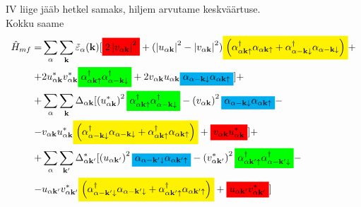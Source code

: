 \documentclass[class=article, crop=false]{standalone}
\newcommand{\mathcolorbox}[2]{\colorbox{#1}{$\displaystyle #2$}}
\begin{document}
IV liige jääb hetkel samaks, hiljem arvutame keskväärtuse.\\
Kokku saame
\begin{equation}\label{key}
	\begin{split}
		\hat{H}_{mf} = & \sum_{ \alpha} \sum_{ \mathbf{k}} \tilde{ \varepsilon}_{ \alpha} ( \mathbf{k}) 
		[ \mathcolorbox{red}{2 \left| v_{ \alpha \mathbf{k}} \right|^{2}} + ( \left| u_{ \alpha \mathbf{k}} \right|^{2} - \left| v_{ \alpha \mathbf{k}} \right|^{2} ) \mathcolorbox{yellow}{ \left( \alpha_{ \alpha \mathbf{k} \uparrow}^{ \dagger} \alpha_{ \alpha \mathbf{k} \uparrow} + \alpha_{ \alpha - \mathbf{k} \downarrow}^{ \dagger} \alpha_{ \alpha - \mathbf{k} \downarrow} \right)} + \\
		+ & 2 u_{ \alpha \mathbf{k}}^{ \ast} v_{ \alpha \mathbf{k}}^{ \ast} \mathcolorbox{green}{ \alpha_{ \alpha \mathbf{k} \uparrow}^{ \dagger} \alpha_{ \alpha - \mathbf{k} \downarrow}^{ \dagger}} + 2 v_{ \alpha \mathbf{k}} u_{ \alpha \mathbf{k}} \mathcolorbox{cyan}{ \alpha_{ \alpha - \mathbf{k} \downarrow} \alpha_{ \alpha \mathbf{k} \uparrow}} ] + \\
		+ & \sum_{ \alpha} \sum_{ \mathbf{k}} \Delta_{ \alpha \mathbf{k}} [ \left( u_{ \alpha \mathbf{k}}^{ \ast} \right)^{2} \mathcolorbox{green}{ \alpha_{ \alpha \mathbf{k} \uparrow}^{ \dagger} \alpha_{ \alpha - \mathbf{k} \downarrow}^{ \dagger}} - \left( v_{ \alpha \mathbf{k}} \right)^{2} \mathcolorbox{cyan}{ \alpha_{ \alpha - \mathbf{k} \downarrow} \alpha_{ \alpha \mathbf{k} \uparrow}} - \\
		- & v_{ \alpha \mathbf{k}} u_{ \alpha \mathbf{k}}^{ \ast} \mathcolorbox{yellow}{ \left( \alpha_{ \alpha - \mathbf{k} \downarrow}^{ \dagger} \alpha_{ \alpha - \mathbf{k} \downarrow} + \alpha_{ \alpha \mathbf{k} \uparrow}^{ \dagger} \alpha_{ \alpha \mathbf{k} \uparrow} \right)} + \mathcolorbox{red}{v_{ \alpha \mathbf{k}} u_{ \alpha \mathbf{k}}^{ \ast}} ] + \\
		+ & \sum_{ \alpha} \sum_{ \mathbf{k}'} \Delta_{ \alpha \mathbf{k}'}^{ \ast} 
		[ \left( u_{ \alpha \mathbf{k}'} \right)^{2} \mathcolorbox{cyan}{ \alpha_{ \alpha - \mathbf{k}' \downarrow} \alpha_{ \alpha \mathbf{k}' \uparrow}} 
		- \left( v_{ \alpha \mathbf{k}'}^{ \ast}\right)^{2} \mathcolorbox{green}{ \alpha_{ \alpha \mathbf{k}' \uparrow}^{ \dagger} \alpha_{ \alpha - \mathbf{k}' \downarrow}^{ \dagger}} - \\
		- & u_{ \alpha \mathbf{k}'} v_{ \alpha \mathbf{k}'}^{ \ast} \mathcolorbox{yellow}{ \left( \alpha_{ \alpha - \mathbf{k}' \downarrow}^{ \dagger} \alpha_{ \alpha - \mathbf{k}' \downarrow} + \alpha_{ \alpha \mathbf{k}' \uparrow}^{ \dagger} \alpha_{ \alpha \mathbf{k}' \uparrow} \right)} + \mathcolorbox{red}{u_{ \alpha \mathbf{k}'} v_{ \alpha \mathbf{k}'}^{ \ast}} ] \\

\end{split}
\end{equation}
\end{document}
